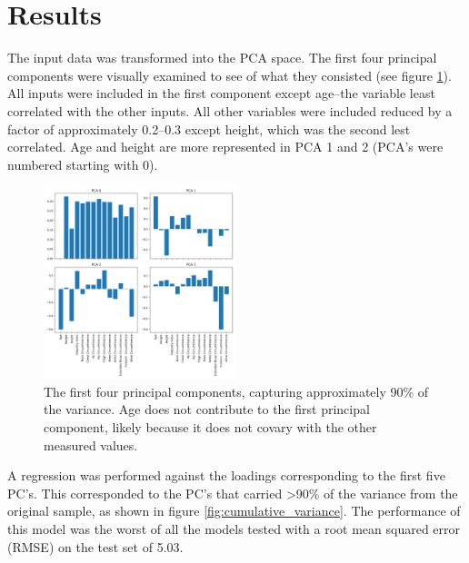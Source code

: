 \documentclass{IEEEtran}
\begin{document}
\section{Results}

The input data was transformed into the PCA space. The first four principal components were visually examined to see of what they consisted (see figure \ref{fig:first_four_pca}). All inputs were included in the first component except age--the variable least correlated with the other inputs. All other variables were included reduced by a factor of approximately \numrange{0.2}{0.3} except height, which was the second lest correlated. Age and height are more represented in PCA 1 and 2 (PCA's were numbered starting with 0). 

\begin{centering}
\begin{figure}
\centering
\begin{center}
	\includegraphics[width=0.5\textwidth]{first_four_pca}
	\caption{The first four principal components, capturing approximately 90\% of the variance. Age does not contribute to the first principal component, likely because it does not covary with the other measured values.\label{fig:first_four_pca}}
\end{center}
\end{figure}
\end{centering}

A regression was performed against the loadings corresponding to the first five PC's. This corresponded to the PC's that carried \textgreater90\% of the variance from the original sample, as shown in figure \ref{fig:cumulative_variance}. The performance of this model was the worst of all the models tested with a root mean squared error (RMSE) on the test set of \num{5.03}.
\end{document}
